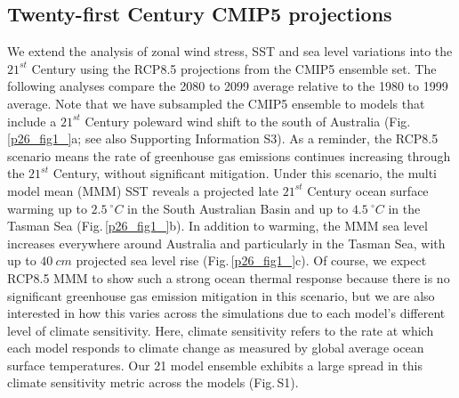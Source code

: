 \documentclass[draft,linenumbers]{agujournal2018}
\begin{document}
\subsection{Twenty-first Century CMIP5 projections}
We extend the analysis of zonal wind stress, SST and sea level variations into the $21^{st}$ Century using the RCP8.5 projections from the CMIP5 ensemble set. The following analyses compare the 2080 to 2099 average relative to the 1980 to 1999 average. Note that we have subsampled the CMIP5 ensemble to models that include a $21^{st}$ Century poleward wind shift to the south of Australia (Fig.\,\ref{p26_fig1_}a; see also Supporting Information S3). As a reminder, the RCP8.5 scenario means the rate of greenhouse gas emissions continues increasing through the $21^{st}$ Century, without significant mitigation. Under this scenario, the multi model mean (MMM) SST reveals a projected late $21^{st}$ Century ocean surface warming up to $2.5\ ^{\circ}C$ in the South Australian Basin and up to $4.5\ ^{\circ}C$ in the Tasman Sea (Fig.\,\ref{p26_fig1_}b). In addition to warming, the MMM sea level increases everywhere around Australia and particularly in the Tasman Sea, with up to $40\ cm$ projected sea level rise (Fig.\,\ref{p26_fig1_}c). Of course, we expect RCP8.5 MMM to show such a strong ocean thermal response because there is no significant greenhouse gas emission mitigation in this scenario, but we are also interested in how this varies across the simulations due to each model's different level of climate sensitivity. Here, climate sensitivity refers to the rate at which each model responds to climate change as measured by global average ocean surface temperatures. Our 21 model ensemble exhibits a large spread in this climate sensitivity metric across the models (Fig.\,S1).
\end{document}

